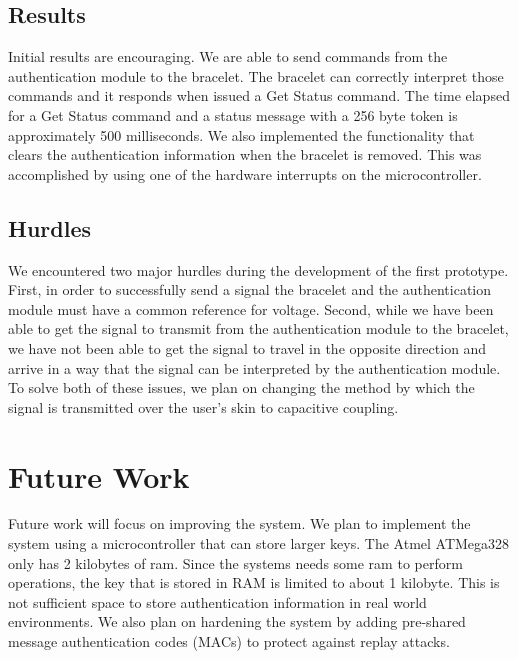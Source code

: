 \documentclass[runningheads,a4paper]{llncs}
\begin{document}
\subsection{Results}
Initial results are encouraging.  We are able to send commands from the authentication module to the bracelet.  The bracelet can correctly interpret those commands and it responds when issued a Get Status command.   The time elapsed for a Get Status command and a status message with a 256 byte token is approximately 500 milliseconds.  
We also implemented the functionality that clears the authentication information when the bracelet is removed.  This was accomplished by using one of the hardware interrupts on the microcontroller. 
\subsection{Hurdles}
We encountered two major hurdles during the development of the first prototype.  First, in order to successfully send a signal the bracelet and the authentication module must have a common reference for voltage.  Second, while we have been able to get the signal to transmit from the authentication module to the bracelet, we have not been able to get the signal to travel in the opposite direction and arrive in a way that the signal can be interpreted by the authentication module.  To solve both of these issues, we plan on changing the method by which the signal is transmitted over the user's skin to capacitive coupling.


\section{Future Work}\label{sec:future}
Future work will focus on improving the system.  We plan to implement the system using a microcontroller that can store larger keys.  The Atmel ATMega328 only has 2 kilobytes of ram.  Since the systems needs some ram to perform operations, the key that is stored in RAM is limited to about 1 kilobyte.  This is not sufficient space to store authentication information in real world environments.  We also plan on hardening the system by adding pre-shared message authentication codes (MACs) to protect against replay attacks.

\end{document}
